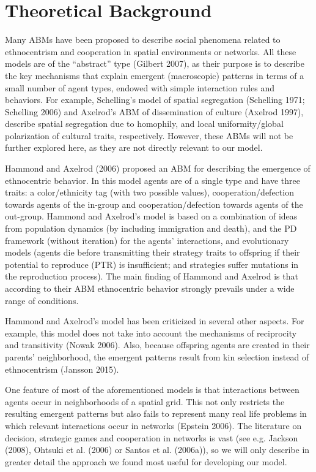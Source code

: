 \section{Theoretical Background}
Many ABMs have been proposed to describe social phenomena related to ethnocentrism and cooperation in spatial environments or networks. All these models are of the ``abstract'' type (Gilbert 2007), as their purpose is to describe the key mechanisms that explain emergent (macroscopic) patterns in terms of a small number of agent types, endowed with simple interaction rules and behaviors. For example, Schelling's model of spatial segregation (Schelling 1971; Schelling 2006) and Axelrod's ABM of dissemination of culture (Axelrod 1997), describe spatial segregation due to homophily, and local uniformity/global polarization of cultural traits, respectively. However, these ABMs will not be further explored here, as they are not directly relevant to our model.

Hammond and Axelrod (2006) proposed an ABM for describing the emergence of ethnocentric behavior. In this model agents are of a single type and have three traits: a color/ethnicity tag (with two possible values), cooperation/defection towards agents of the in-group and cooperation/defection towards agents of the out-group. Hammond and Axelrod's model is based on a combination of ideas from population dynamics (by including immigration and death), and the PD framework (without iteration) for the agents' interactions, and evolutionary models (agents die before transmitting their strategy traits to offspring if their potential to reproduce (PTR) is insufficient; and strategies suffer mutations in the reproduction process). The main finding of Hammond and Axelrod is that according to their ABM ethnocentric behavior strongly prevails under a wide range of conditions.

Hammond and Axelrod's model has been criticized in several other aspects. For example, this model does not take into account the mechanisms of reciprocity and transitivity (Nowak 2006). Also, because offspring agents are created in their parents' neighborhood, the emergent patterns result from kin selection instead of ethnocentrism (Jansson 2015).

One feature of most of the aforementioned models is that interactions between agents occur in neighborhoods of a spatial grid. This not only restricts the resulting emergent patterns but also fails to represent many real life problems in which relevant interactions occur in networks (Epstein 2006). The literature on decision, strategic games and cooperation in networks is vast (see e.g. Jackson (2008), Ohtsuki et al. (2006) or Santos et al. (2006a)), so we will only describe in greater detail the approach we found most useful for developing our model.

